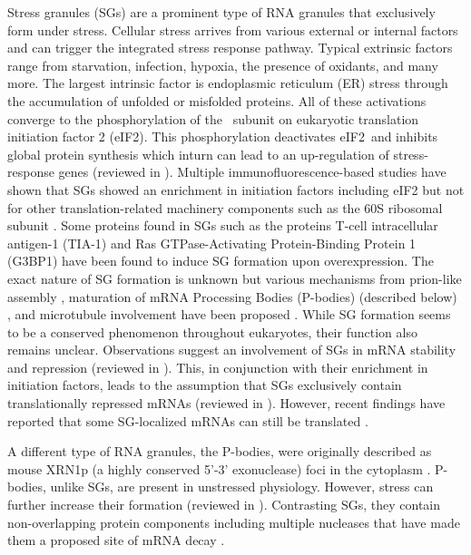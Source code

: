 Stress granules (SGs) are a prominent type of RNA granules that exclusively form under stress.
Cellular stress arrives from various external or internal factors and can trigger the integrated stress response pathway.
Typical extrinsic factors range from starvation, infection, hypoxia, the presence of oxidants, and many more.
The largest intrinsic factor is endoplasmic reticulum (ER) stress through the accumulation of unfolded or misfolded proteins.
All of these activations converge to the phosphorylation of the \textalpha\ subunit on eukaryotic translation initiation factor 2 (eIF2\textalpha).
This phosphorylation deactivates eIF2\textalpha\ and inhibits global protein synthesis which inturn can lead to an up-regulation of stress-response genes (reviewed in \cite{pakoszebrucka_integrated_2016}).
Multiple immunofluorescence-based studies have shown that SGs showed an enrichment in initiation factors including eIF2 but not for other translation-related machinery components such as the 60S ribosomal subunit \cite{kimball_mammalian_2003}.
Some proteins found in SGs such as the proteins T-cell intracellular antigen-1 (TIA-1) \cite{kedersha_rna-binding_1999} and Ras GTPase-Activating Protein-Binding Protein 1 (G3BP1) \cite{tourriere_rasgap-associated_2003} have been found to induce SG formation upon overexpression.
The exact nature of SG formation is unknown but various mechanisms from prion-like assembly \cite{gilks_stress_2004, shattuck_prion-like_2019}, maturation of mRNA Processing Bodies (P-bodies) (described below) \cite{buchan_p_2008}, and microtubule involvement have been proposed \cite{ivanov_disruption_2003}.
While SG formation seems to be a conserved phenomenon throughout eukaryotes, their function also remains unclear.
Observations suggest an involvement of SGs in mRNA stability and repression (reviewed in \cite{buchan_eukaryotic_2009}).
This, in conjunction with their enrichment in initiation factors, leads to the assumption that SGs exclusively contain translationally repressed mRNAs (reviewed in \cite{thomas_rna_2011}).
However, recent findings have reported that some SG-localized mRNAs can still be translated \cite{mateju_single-molecule_2020}.

A different type of RNA granules, the P-bodies, were originally described as mouse XRN1p (a highly conserved 5'-3' exonuclease) foci in the cytoplasm \cite{bashkirov_mouse_1997}.
P-bodies, unlike SGs, are present in unstressed physiology.
However, stress can further increase their formation (reviewed in \cite{parker_p_2007}).
Contrasting SGs, they contain non-overlapping protein components including multiple nucleases that have made them a proposed site of mRNA decay \cite{sheth_decapping_2003}.

